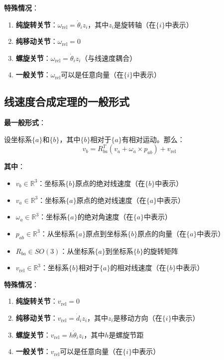 \documentclass[12pt,a4paper]{article}
\begin{document}
\textbf{特殊情况}：
\begin{enumerate}
\item \textbf{纯旋转关节}：$\omega_{\text{rel}} = \dot{\theta}_i z_i$，其中$z_i$是旋转轴（在$\{i\}$中表示）
\item \textbf{纯移动关节}：$\omega_{\text{rel}} = 0$
\item \textbf{螺旋关节}：$\omega_{\text{rel}} = \dot{\theta}_i z_i$（与线速度耦合）
\item \textbf{一般关节}：$\omega_{\text{rel}}$可以是任意向量（在$\{i\}$中表示）
\end{enumerate}

\subsection{线速度合成定理的一般形式}

\textbf{最一般形式}：

设坐标系$\{a\}$和$\{b\}$，其中$\{b\}$相对于$\{a\}$有相对运动。那么：
\begin{equation}
v_b = R_{ba}^T (v_a + \omega_a \times p_{ab}) + v_{\text{rel}} \tag{4-一般}
\end{equation}

\textbf{其中}：
\begin{itemize}
\item $v_b \in \mathbb{R}^3$：坐标系$\{b\}$原点的绝对线速度（在$\{b\}$中表示）
\item $v_a \in \mathbb{R}^3$：坐标系$\{a\}$原点的绝对线速度（在$\{a\}$中表示）
\item $\omega_a \in \mathbb{R}^3$：坐标系$\{a\}$的绝对角速度（在$\{a\}$中表示）
\item $p_{ab} \in \mathbb{R}^3$：从坐标系$\{a\}$原点到坐标系$\{b\}$原点的向量（在$\{a\}$中表示）
\item $R_{ba} \in SO(3)$：从坐标系$\{a\}$到坐标系$\{b\}$的旋转矩阵
\item $v_{\text{rel}} \in \mathbb{R}^3$：坐标系$\{b\}$相对于$\{a\}$的相对线速度（在$\{b\}$中表示）
\end{itemize}

\textbf{特殊情况}：
\begin{enumerate}
\item \textbf{纯旋转关节}：$v_{\text{rel}} = 0$
\item \textbf{纯移动关节}：$v_{\text{rel}} = \dot{d}_i z_i$，其中$z_i$是移动方向（在$\{i\}$中表示）
\item \textbf{螺旋关节}：$v_{\text{rel}} = h \dot{\theta}_i z_i$，其中$h$是螺旋节距
\item \textbf{一般关节}：$v_{\text{rel}}$可以是任意向量（在$\{i\}$中表示）
\end{enumerate}
\end{document}
